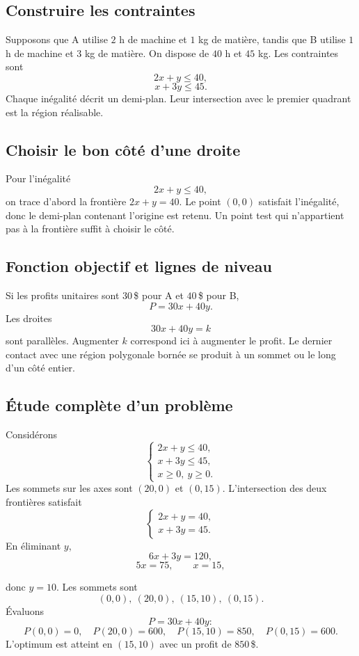 \subsection{Construire les contraintes}

Supposons que A utilise $2$ h de machine et $1$ kg de matière, tandis que B utilise $1$ h de machine et $3$ kg de matière. On dispose de $40$ h et $45$ kg. Les contraintes sont
\[
2x+y\leq40,
\]
\[
x+3y\leq45.
\]
Chaque inégalité décrit un demi-plan. Leur intersection avec le premier quadrant est la région réalisable.

\subsection{Choisir le bon côté d'une droite}

Pour l'inégalité
\[
2x+y\leq40,
\]
on trace d'abord la frontière $2x+y=40$. Le point $(0,0)$ satisfait l'inégalité, donc le demi-plan contenant l'origine est retenu. Un point test qui n'appartient pas à la frontière suffit à choisir le côté.

\subsection{Fonction objectif et lignes de niveau}

Si les profits unitaires sont $30\,$\$ pour A et $40\,$\$ pour B,
\[
P=30x+40y.
\]
Les droites
\[
30x+40y=k
\]
sont parallèles. Augmenter $k$ correspond ici à augmenter le profit. Le dernier contact avec une région polygonale bornée se produit à un sommet ou le long d'un côté entier.

\subsection{Étude complète d'un problème}

Considérons
\[
\begin{cases}
2x+y\leq40,\\
x+3y\leq45,\\
x\geq0,\ y\geq0.
\end{cases}
\]
Les sommets sur les axes sont $(20,0)$ et $(0,15)$. L'intersection des deux frontières satisfait
\[
\begin{cases}
2x+y=40,\\
x+3y=45.
\end{cases}
\]
En éliminant $y$,
\[
6x+3y=120,
\]
\[
5x=75,
\qquad x=15,
\]

donc $y=10$. Les sommets sont
\[
(0,0),\ (20,0),\ (15,10),\ (0,15).
\]
Évaluons
\[
P=30x+40y:
\]
\[
P(0,0)=0,
\quad
P(20,0)=600,
\quad
P(15,10)=850,
\quad
P(0,15)=600.
\]
L'optimum est atteint en $(15,10)$ avec un profit de $850\,$\$.

